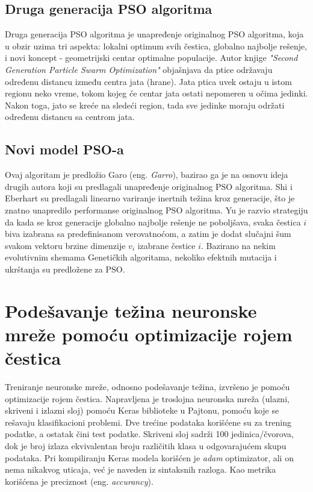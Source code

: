 \documentclass[a4paper]{article}
\begin{document}
{%


\subsection{Druga generacija PSO algoritma}
\label{subsec:sgpso}

Druga generacija PSO algoritma je unapređenje originalnog PSO algoritma, koja u obzir uzima tri aspekta: lokalni optimum svih čestica, globalno najbolje rešenje, i novi koncept - geometrijski centar optimalne populacije. Autor knjige \textit{"{}Second Generation Particle Swarm Optimization"} objašnjava da ptice održavaju  određenu distancu između centra jata (hrane). Jata ptica uvek ostaju u istom regionu neko vreme, tokom kojeg će centar jata ostati nepomeren u očima jedinki. Nakon toga, jato se kreće na sledeći region, tada sve jedinke moraju održati određenu distancu sa centrom jata.

\subsection{Novi model PSO-a}
\label{subsec:nmpso}

Ovaj algoritam je predložio Garo (eng. \textit{Garro}), bazirao ga je na osnovu ideja drugih autora koji su predlagali unapređenje originalnog PSO algoritma. Shi i Eberhart su predlagali linearno variranje inertnih težina kroz generacije, što je znatno unapredilo performanse originalnog PSO algoritma.
Yu je razvio strategiju da kada se kroz generacije globalno najbolje rešenje ne poboljšava, svaka čestica \textit{$i$} biva izabrana sa predefinisanom verovatnoćom, a zatim je dodat slučajni šum svakom vektoru brzine dimenzije $v_i$ izabrane čestice \textit{$i$}. Bazirano na nekim evolutivnim shemama Genetičkih algoritama, nekoliko efektnih mutacija i ukrštanja su predložene za PSO.

\section{Podešavanje težina neuronske mreže pomoću optimizacije rojem čestica}
\label{sec:podesavanjetezina}

Treniranje neuronske mreže, odnosno podešavanje težina, izvršeno je pomoću optimizacije rojem čestica. 
Napravljena je troslojna neuronska mreža (ulazni, skriveni i izlazni sloj) pomoću Keras biblioteke u Pajtonu, pomoću koje se rešavaju klasifikacioni problemi. Dve trećine podataka korišćene su za trening podatke, a ostatak čini test podatke. Skriveni sloj sadrži 100 jedinica/čvorova, dok je broj izlaza ekvivalentan broju različitih klasa u odgovarajućem skupu podataka. Pri kompiliranju Keras modela korišćen je \textit{adam} optimizator, ali on nema nikakvog uticaja, već je naveden iz sintaksnih razloga. Kao metrika korišćena je preciznost (eng. \emph{accurancy}). 

}
\end{document}
